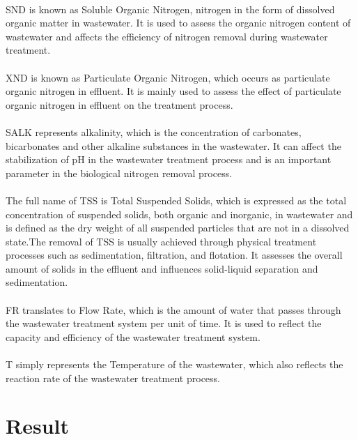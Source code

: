 \documentclass[]{iat}
\begin{document}
\\
SND is known as Soluble Organic Nitrogen, nitrogen in the form of dissolved organic matter in wastewater. It is used to assess the organic nitrogen content of wastewater and affects the efficiency of nitrogen removal during wastewater treatment.\\
\\
XND is known as Particulate Organic Nitrogen, which occurs as particulate organic nitrogen in effluent. It is mainly used to assess the effect of particulate organic nitrogen in effluent on the treatment process.\\
\\
SALK represents alkalinity, which is the concentration of carbonates, bicarbonates and other alkaline substances in the wastewater. It can affect the stabilization of pH in the wastewater treatment process and is an important parameter in the biological nitrogen removal process.\\
\\
The full name of TSS is Total Suspended Solids, which is expressed as the total concentration of suspended solids, both organic and inorganic, in wastewater and is defined as the dry weight of all suspended particles that are not in a dissolved state.The removal of TSS is usually achieved through physical treatment processes such as sedimentation, filtration, and flotation. It assesses the overall amount of solids in the effluent and influences solid-liquid separation and sedimentation.\\
\\
FR translates to Flow Rate, which is the amount of water that passes through the wastewater treatment system per unit of time. It is used to reflect the capacity and efficiency of the wastewater treatment system.\\
\\
T simply represents the Temperature of the wastewater, which also reflects the reaction rate of the wastewater treatment process.
\chapter{Result}
\end{document}
